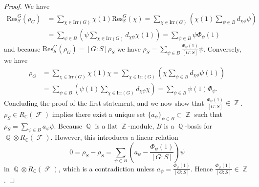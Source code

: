 \documentclass[10pt,a4paper]{amsart}
\DeclareMathOperator{\C}{\mathbb{C}}
\DeclareMathOperator{\Q}{\mathbb{Q}}
\DeclareMathOperator{\Z}{\mathbb{Z}}
\DeclareMathOperator{\sF}{\mathcal{F}}
\begin{document}
\begin{proof}
We have
\begin{align*}
\mathrm{Res}^G_S(\rho_G) &= \sum_{\chi \in \text{Irr}(G)} \chi(1)\mathrm{Res}^G_S(\chi) = \sum_{\chi \in \text{Irr}(G)}\left(\chi(1)\sum_{\psi \in B} d_{\chi\phi}\psi\right) \\ 
&= \sum_{\psi \in B} \left(\psi \sum_{\chi \in \text{Irr}(G)} d_{\chi\psi}\chi(1)\right) = \sum_{\psi \in B} \psi\Phi_{\psi}(1)
\end{align*}
and because $\mathrm{Res}^G_S(\rho_G) = [G:S]\rho_S$ we have $\rho_S = \displaystyle \sum_{\psi \in B} \frac{\Phi_{\psi}(1)}{[G:S]}\psi$. Conversely, we have
{\allowdisplaybreaks\begin{align*}
\rho_G &= \sum_{\chi \in \text{Irr}(G)} \chi(1)\chi = \sum_{\chi \in \text{Irr}(G)}\left(\chi\sum_{\psi \in B} d_{\chi\phi}\psi(1)\right) \\ 
&= \sum_{\psi \in B} \left(\psi(1) \sum_{\chi \in \text{Irr}(G)} d_{\chi\psi}\chi\right) = \sum_{\psi \in B} \psi(1)\Phi_{\psi}.
\end{align*}}
Concluding the proof of the first statement, and we now show that $\frac{\Phi_{\psi}(1)}{[G:S]} \in \Z$. $\rho_S \in R_{\C}(\sF)$ implies there exist a unique set $\{a_{\psi}\}_{\psi \in B} \subset \Z$ such that $\rho_S = \sum_{\psi \in B} a_{\psi}\psi$. Because $\Q$ is a flat $\Z$-module, $B$ is a $\Q$-basis for $\Q \otimes R_{\C}(\sF)$. However, this introduces a linear relation 
\[0 = \rho_S-\rho_S = \sum_{\psi \in B}\left(a_{\psi}-\frac{\Phi_{\psi}(1)}{[G:S]}\right)\psi\]
in $\Q \otimes R_{\C}(\sF)$, which is a contradiction unless $a_{\psi} = \frac{\Phi_{\psi}(1)}{[G : S]}$. Hence $\frac{\Phi_{\psi}(1)}{[G:S]} \in \Z$.
\end{proof}
\end{document}

